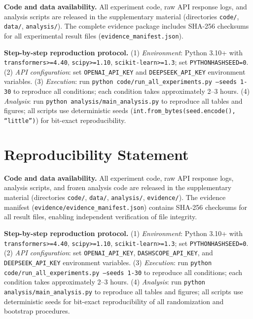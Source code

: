 \documentclass[11pt]{article}
\begin{document}
\textbf{Code and data availability.} All experiment code, raw API response logs, and analysis scripts are released in the supplementary material (directories \texttt{code/}, \texttt{data/}, \texttt{analysis/}). The complete evidence package includes SHA-256 checksums for all experimental result files (\texttt{evidence\_manifest.json}).

\textbf{Step-by-step reproduction protocol.} (1) \textit{Environment}: Python 3.10+ with \texttt{transformers>=4.40}, \texttt{scipy>=1.10}, \texttt{scikit-learn>=1.3}; set \texttt{PYTHONHASHSEED=0}. (2) \textit{API configuration}: set \texttt{OPENAI\_API\_KEY} and \texttt{DEEPSEEK\_API\_KEY} environment variables. (3) \textit{Execution}: run \texttt{python code/run\_all\_experiments.py --seeds 1-30} to reproduce all conditions; each condition takes approximately 2--3 hours. (4) \textit{Analysis}: run \texttt{python analysis/main\_analysis.py} to reproduce all tables and figures; all scripts use deterministic seeds (\texttt{int.from\_bytes(seed.encode(), ``little'')}) for bit-exact reproducibility.


\section*{Reproducibility Statement}
\label{sec:reproducibility}

\textbf{Code and data availability.} All experiment code, raw API response logs, analysis scripts, and frozen analysis code are released in the supplementary material (directories \texttt{code/}, \texttt{data/}, \texttt{analysis/}, \texttt{evidence/}). The evidence manifest (\texttt{evidence/evidence\_manifest.json}) contains SHA-256 checksums for all result files, enabling independent verification of file integrity.

\textbf{Step-by-step reproduction protocol.} (1) \textit{Environment}: Python 3.10+ with \texttt{transformers>=4.40}, \texttt{scipy>=1.10}, \texttt{scikit-learn>=1.3}; set \texttt{PYTHONHASHSEED=0}. (2) \textit{API configuration}: set \texttt{OPENAI\_API\_KEY}, \texttt{DASHSCOPE\_API\_KEY}, and \texttt{DEEPSEEK\_API\_KEY} environment variables. (3) \textit{Execution}: run \texttt{python code/run\_all\_experiments.py --seeds 1-30} to reproduce all conditions; each condition takes approximately 2--3 hours. (4) \textit{Analysis}: run \texttt{python analysis/main\_analysis.py} to reproduce all tables and figures; all scripts use deterministic seeds for bit-exact reproducibility of all randomization and bootstrap procedures.
\end{document}
